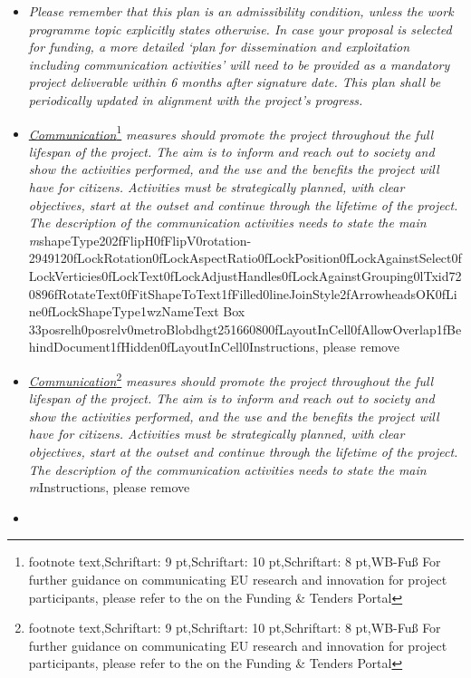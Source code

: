 \begin{itemize}
\item
  \emph{Please remember that this plan is an admissibility condition,
  unless the work programme topic explicitly states otherwise. In case
  your proposal is selected for funding, a more detailed `plan for
  dissemination and exploitation including communication activities'
  will need to be provided as a mandatory project deliverable within 6
  months after signature date. This plan shall be periodically updated
  in alignment with the project's progress. }
\item
  \emph{\uline{Communication}}\footnote{footnote text,Schriftart: 9
    pt,Schriftart: 10 pt,Schriftart: 8 pt,WB-Fuß For further guidance on
    communicating EU research and innovation for project participants,
    please refer to the on the Funding \& Tenders Portal}\emph{ measures
  should promote the project throughout the full lifespan of the
  project. The aim is to inform and reach out to society and show the
  activities performed, and the use and the benefits the project will
  have for citizens. Activities must be strategically planned, with
  clear objectives, start at the outset and continue through the
  lifetime of the project. The description of the communication
  activities needs to state the main
  m}shapeType202fFlipH0fFlipV0rotation-2949120fLockRotation0fLockAspectRatio0fLockPosition0fLockAgainstSelect0fLockVerticies0fLockText0fLockAdjustHandles0fLockAgainstGrouping0lTxid720896fRotateText0fFitShapeToText1fFilled0lineJoinStyle2fArrowheadsOK0fLine0fLockShapeType1wzNameText
  Box
  33posrelh0posrelv0metroBlobdhgt251660800fLayoutInCell0fAllowOverlap1fBehindDocument1fHidden0fLayoutInCell0Instructions,
  please remove
\item
  \emph{\uline{Communication}}\footnote{footnote text,Schriftart: 9
    pt,Schriftart: 10 pt,Schriftart: 8 pt,WB-Fuß For further guidance on
    communicating EU research and innovation for project participants,
    please refer to the on the Funding \& Tenders Portal}\emph{ measures
  should promote the project throughout the full lifespan of the
  project. The aim is to inform and reach out to society and show the
  activities performed, and the use and the benefits the project will
  have for citizens. Activities must be strategically planned, with
  clear objectives, start at the outset and continue through the
  lifetime of the project. The description of the communication
  activities needs to state the main m}Instructions, please remove
\item

\end{itemize}
